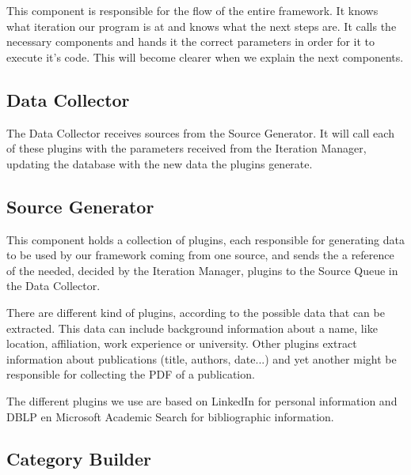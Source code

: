 This component is responsible for the flow of the entire framework. It knows what iteration our program is at and knows what the next steps are. It calls the necessary components and hands it the correct parameters in order for it to execute it's code. This will become clearer when we explain the next components.

\subsection{Data Collector}

The Data Collector receives sources from the Source Generator. It will call each of these plugins with the parameters received from the Iteration Manager, updating the database with the new data the plugins generate.

\subsection{Source Generator}

This component holds a collection of plugins, each responsible for generating data to be used by our framework coming from one source, and sends the a reference of the needed, decided by the Iteration Manager, plugins to the Source Queue in the Data Collector. 

There are different kind of plugins, according to the possible data that can be extracted. This data can include background information about a name, like location, affiliation, work experience or university. Other plugins extract information about publications (title, authors, date...) and yet another might be responsible for collecting the PDF of a publication.


The different plugins we use are based on LinkedIn for personal information and DBLP en Microsoft Academic Search for bibliographic information.


\subsection{Category Builder}
\label{categorybuilder}


